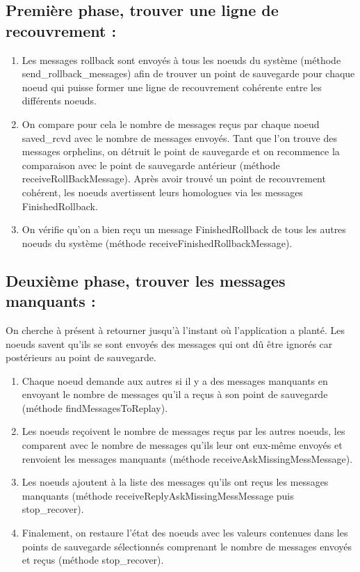 \documentclass[11pt,a4paper]{report}
\begin{document}
\subsection{Première phase, trouver une ligne de recouvrement :}
\begin{enumerate}
\item Les messages rollback sont envoyés à tous les noeuds du système (méthode send\_rollback\_messages) afin de trouver un point de sauvegarde pour chaque noeud qui puisse former une ligne de recouvrement cohérente entre les différents noeuds.
\item On compare pour cela le nombre de messages reçus par chaque noeud saved\_rcvd avec le nombre de messages envoyés. Tant que l'on trouve des messages orphelins, on détruit le point de sauvegarde et on recommence la comparaison avec le point de sauvegarde antérieur (méthode receiveRollBackMessage). Après avoir trouvé un point de recouvrement cohérent, les noeuds avertissent leurs homologues via les messages FinishedRollback.
\item On vérifie qu'on a bien reçu un message FinishedRollback de tous les autres noeuds du système (méthode receiveFinishedRollbackMessage).
\end{enumerate}

\subsection{Deuxième phase, trouver les messages manquants :}

On cherche à présent à retourner jusqu'à l'instant où l'application a planté. Les noeuds savent qu'ils se sont envoyés des messages qui ont dû être ignorés car postérieurs au point de sauvegarde.
\begin{enumerate}
\item Chaque noeud demande aux autres si il y a des messages manquants en envoyant le nombre de messages qu'il a reçus à son point de sauvegarde (méthode findMessagesToReplay).
\item Les noeuds reçoivent le nombre de messages reçus par les autres noeuds, les comparent avec le nombre de messages qu'ils leur ont eux-même envoyés et renvoient les messages manquants (méthode receiveAskMissingMessMessage).
\item Les noeuds ajoutent à la liste des messages qu'ils ont reçus les messages manquants (méthode receiveReplyAskMissingMessMessage puis stop\_recover).
\item Finalement, on restaure l'état des noeuds avec les valeurs contenues dans les points de sauvegarde sélectionnés comprenant le nombre de messages envoyés et reçus (méthode stop\_recover).
\end{enumerate}
\end{document}
